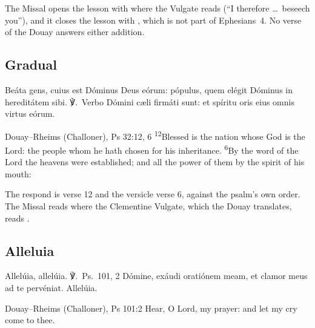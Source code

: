 \noindent The Missal opens the lesson with  where the
Vulgate reads  (``I therefore \dots\ beseech you''),
and it closes the lesson with , which is not part of Ephesians~4. No verse of the Douay answers either
addition.

\subsection{Gradual}
\label{proper-gradual}


\begin{latinproper}
Beáta gens, cuius est Dóminus Deus eórum: pópulus, quem elégit Dóminus in
hereditátem sibi. ℣.~Verbo Dómini cæli firmáti sunt: et spíritu oris eius
omnis virtus eórum.
\end{latinproper}

\begin{englishwitness}{Douay--Rheims (Challoner), Ps 32:12, 6}
\textsuperscript{12}Blessed is the nation whose God is the Lord: the people
whom he hath chosen for his inheritance. \textsuperscript{6}By the word of the
Lord the heavens were established; and all the power of them by the spirit of
his mouth:
\end{englishwitness}

\noindent The respond is verse 12 and the versicle verse 6, against the psalm's own
order. The Missal reads 
where the Clementine Vulgate, which the Douay translates, reads .

\subsection{Alleluia}
\label{proper-alleluia}


\begin{latinproper}
Allelúia, allelúia. ℣.~\textnormal{Ps.\ 101, 2} Dómine, exáudi oratiónem meam,
et clamor meus ad te pervéniat. Allelúia.
\end{latinproper}

\begin{englishwitness}{Douay--Rheims (Challoner), Ps 101:2}
Hear, O Lord, my prayer: and let my cry come to thee.
\end{englishwitness}

